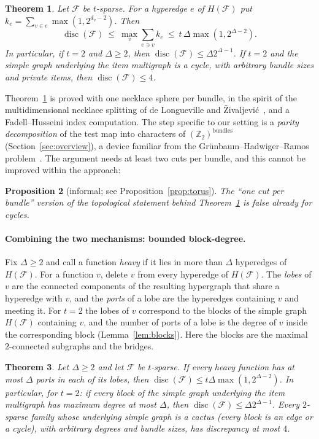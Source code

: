 \documentclass[11pt,letterpaper]{article}
\newtheorem{theorem}{Theorem}[section]
\newtheorem{proposition}[theorem]{Proposition}
\theoremstyle{definition}
\newcommand{\Z}{\mathbb{Z}}
\newcommand{\cF}{\mathcal{F}}
\DeclareMathOperator{\disc}{disc}
\begin{document}
\begin{theorem}\label{thm:C}
Let $\cF$ be $t$-sparse. For a hyperedge $e$ of $H(\cF)$ put
$k_e=\sum_{v\in e}\max(1,2^{d_v-2})$. Then
\[
  \disc(\cF)\ \le\ \max_v\sum_{e\ni v}k_e\ \le\ t\,\Delta\max(1,2^{\Delta-2}) .
\]
In particular, if $t=2$ and $\Delta\ge2$, then $\disc(\cF)\le\Delta2^{\Delta-1}$. If $t=2$ and the
simple graph underlying the item multigraph is a cycle, with arbitrary bundle sizes and private
items, then $\disc(\cF)\le4$.
\end{theorem}

Theorem~\ref{thm:C} is proved with one necklace sphere per bundle, in the spirit of the
multidimensional necklace splitting of de Longueville and \v{Z}ivaljevi\'c~\cite{dLZ08}, and a
Fadell--Husseini index computation. The step specific to our setting is a \emph{parity
decomposition} of the test map into characters of $(\Z_2)^{\text{bundles}}$
(Section~\ref{sec:overview}), a device familiar from the Gr\"unbaum--Hadwiger--Ramos
problem~\cite{Ram96,BFHZ18}. The argument needs at least two cuts per bundle, and
this cannot be improved within the approach:

\begin{proposition}[informal; see Proposition~\ref{prop:torus}]\label{prop:torus-informal}
The ``one cut per bundle'' version of the topological statement behind Theorem~\ref{thm:C} is
false already for cycles.
\end{proposition}

\paragraph{Combining the two mechanisms: bounded block-degree.}
Fix $\Delta\ge2$ and call a function \emph{heavy} if it lies in more than $\Delta$ hyperedges of
$H(\cF)$. For a function $v$, delete $v$ from every hyperedge of $H(\cF)$. The \emph{lobes} of $v$ are
the connected components of the resulting hypergraph that share a hyperedge with $v$, and the
\emph{ports} of a lobe are the hyperedges containing $v$ and meeting it. For $t=2$ the lobes of $v$
correspond to the blocks of the simple graph $H(\cF)$ containing $v$, and the number of ports of a
lobe is the degree of $v$ inside the corresponding block (Lemma~\ref{lem:blocks}). Here the blocks
are the maximal $2$-connected subgraphs and the bridges.

\begin{theorem}\label{thm:D}
Let $\Delta\ge2$ and let $\cF$ be $t$-sparse. If every heavy function has at most $\Delta$ ports in
each of its lobes, then $\disc(\cF)\le t\Delta\max(1,2^{\Delta-2})$. In particular, for $t=2$: if
every block of the simple graph underlying the item multigraph has maximum degree at most $\Delta$,
then $\disc(\cF)\le\Delta2^{\Delta-1}$. Every $2$-sparse family whose underlying simple graph is a
\emph{cactus} (every block is an edge or a cycle), with arbitrary degrees and bundle sizes, has
discrepancy at most $4$.
\end{theorem}
\end{document}
